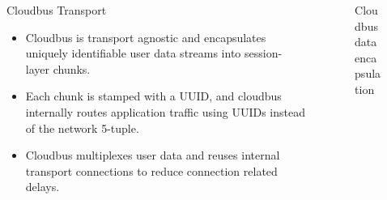 \begin{frame}
{\begin{columns}
\begin{column}{0.5\textwidth}
\begin{block}{Cloudbus Transport}
					\footnotesize
					\begin{itemize}
						\item Cloudbus is transport agnostic and encapsulates uniquely identifiable user data streams into session-layer chunks.
						\item Each chunk is stamped with a UUID, and cloudbus internally routes application traffic using UUIDs instead of the network %
						5-tuple.
						\item Cloudbus multiplexes user data and reuses internal transport connections to reduce connection related delays.
					\end{itemize}
					\normalsize
				\end{block}
			\end{column}
			\begin{column}{0.5\textwidth}
				\begin{figure}
					
					\caption{Cloudbus data encapsulation}
				\end{figure}
			\end{column}
		\end{columns}
	}
\end{frame}